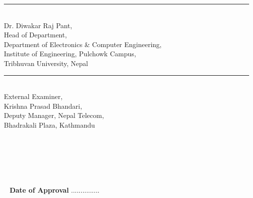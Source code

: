 \begin{minipage}[t]{0.55\textwidth}
  \rule{2in}{1pt}\\
  Dr. Diwakar Raj Pant,\\
  Head of Department,\\
  \small
  Department of Electronics \& Computer Engineering,\\
  Institute of Engineering, Pulchowk Campus,\\
  Tribhuvan University, Nepal
\end{minipage}
\hspace{0.5cm}
\begin{minipage}[t]{0.40\textwidth}
  \rule{2in}{1pt}\\
  External Examiner,\\
  Krishna Prasad Bhandari,\\
  Deputy Manager, Nepal Telecom,\\
  Bhadrakali Plaza, Kathmandu\\
\end{minipage}
~

~

~
~

~
{\bf Date of Approval} ...............\\
